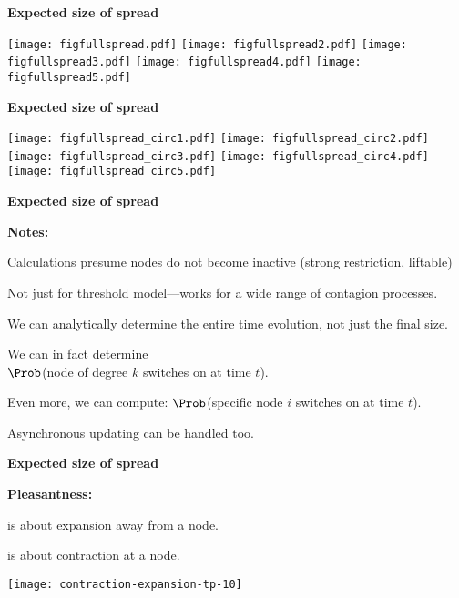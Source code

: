 \begin{frame}[plain]
  \textbf{Expected size of spread}

  \texttt{[image: figfullspread.pdf]}
  \texttt{[image: figfullspread2.pdf]}
  \texttt{[image: figfullspread3.pdf]}
  \texttt{[image: figfullspread4.pdf]}
  \texttt{[image: figfullspread5.pdf]}


  \textbf{Expected size of spread}

  \texttt{[image: figfullspread\_circ1.pdf]}
  \texttt{[image: figfullspread\_circ2.pdf]}
  \texttt{[image: figfullspread\_circ3.pdf]}
  \texttt{[image: figfullspread\_circ4.pdf]}
  \texttt{[image: figfullspread\_circ5.pdf]}



  \textbf{Expected size of spread}

  \textbf{Notes:}
    
     
      Calculations presume
      nodes do not become inactive (strong restriction, liftable)
    
      Not just for threshold model---works
      for a wide range of contagion processes.
    
      We can analytically determine the entire time evolution,
      not just the final size.
    
      We can in fact determine \\
      $\Prob$(node of degree $k$ switches on at time $t$).
    
      Even more, we can compute:
      $\Prob$(specific node $i$ switches on at time $t$).
    
      Asynchronous updating can be handled too.
    
  



  \textbf{Expected size of spread}

  \textbf{Pleasantness:}
    
     
       is about \alert{expansion} away from
      a node.
     
       is about \alert{contraction} at
      a node.
    
    \texttt{[image: contraction-expansion-tp-10]}
  



\end{frame}
